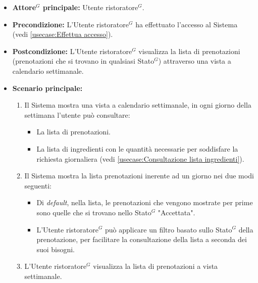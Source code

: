 \label{usecase:Visualizzazione lista prenotazioni}
\begin{itemize}
	\item \textbf{\gls{Attore}$^G$ principale:} \gls{Utente ristoratore}$^G$.

	\item \textbf{Precondizione:} L'\gls{Utente ristoratore}$^G$ ha effettuato l'accesso al Sistema (vedi \autoref{usecase:Effettua accesso}).

	\item \textbf{Postcondizione:} L'\gls{Utente ristoratore}$^G$ visualizza la lista di prenotazioni (prenotazioni che si trovano in qualsiasi \gls{Stato}$^G$) attraverso una vista a calendario settimanale.

	\item \textbf{Scenario principale:}
	      \begin{enumerate}
		      \item Il Sistema mostra una vista a calendario settimanale, in ogni giorno della settimana l'utente può consultare:
		            \begin{itemize}
			            \item La lista di prenotazioni.
			            \item La lista di ingredienti con le quantità necessarie per soddisfare la richiesta giornaliera (vedi \autoref{usecase:Consultazione lista ingredienti}).
		            \end{itemize}

		      \item Il Sistema mostra la lista prenotazioni inerente ad un giorno nei due modi seguenti:
		            \begin{itemize}
			            \item Di \textit{default}, nella lista, le prenotazioni che vengono mostrate per prime sono quelle che si trovano nello \gls{Stato}$^G$ "Accettata".

			            \item L'\gls{Utente ristoratore}$^G$ può applicare un filtro basato sullo \gls{Stato}$^G$ della prenotazione, per facilitare la consultazione della lista a seconda dei suoi bisogni.
		            \end{itemize}

		      \item L'\gls{Utente ristoratore}$^G$ visualizza la lista di prenotazioni a vista settimanale.
	      \end{enumerate}
\end{itemize}


